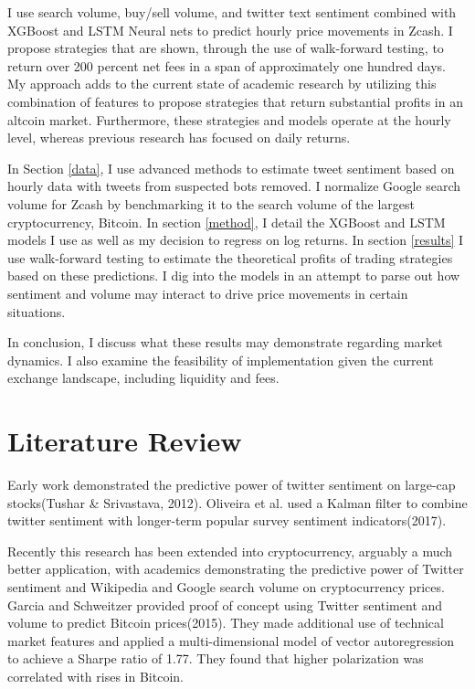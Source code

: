 \documentclass[12pt,twoside]{dukestatscithesis}
\begin{document}
I use search volume, buy/sell volume, and twitter text sentiment
combined with XGBoost and LSTM Neural nets to predict hourly price
movements in Zcash. I propose strategies that are shown, through the use
of walk-forward testing, to return over 200 percent net fees in a span
of approximately one hundred days. My approach adds to the current state
of academic research by utilizing this combination of features to
propose strategies that return substantial profits in an altcoin market.
Furthermore, these strategies and models operate at the hourly level,
whereas previous research has focused on daily returns.

In Section \ref{data}, I use advanced methods to estimate tweet
sentiment based on hourly data with tweets from suspected bots removed.
I normalize Google search volume for Zcash by benchmarking it to the
search volume of the largest cryptocurrency, Bitcoin. In section
\ref{method}, I detail the XGBoost and LSTM models I use as well as my
decision to regress on log returns. In section \ref{results} I use
walk-forward testing to estimate the theoretical profits of trading
strategies based on these predictions. I dig into the models in an
attempt to parse out how sentiment and volume may interact to drive
price movements in certain situations.

In conclusion, I discuss what these results may demonstrate regarding
market dynamics. I also examine the feasibility of implementation given
the current exchange landscape, including liquidity and fees.

\chapter*{Literature Review}\label{literature-review}

Early work demonstrated the predictive power of twitter sentiment on
large-cap stocks(Tushar \& Srivastava, 2012). Oliveira et al. used a
Kalman filter to combine twitter sentiment with longer-term popular
survey sentiment indicators(2017).

Recently this research has been extended into cryptocurrency, arguably a
much better application, with academics demonstrating the predictive
power of Twitter sentiment and Wikipedia and Google search volume on
cryptocurrency prices. Garcia and Schweitzer provided proof of concept
using Twitter sentiment and volume to predict Bitcoin prices(2015). They
made additional use of technical market features and applied a
multi-dimensional model of vector autoregression to achieve a Sharpe
ratio of 1.77. They found that higher polarization was correlated with
rises in Bitcoin.
\end{document}
